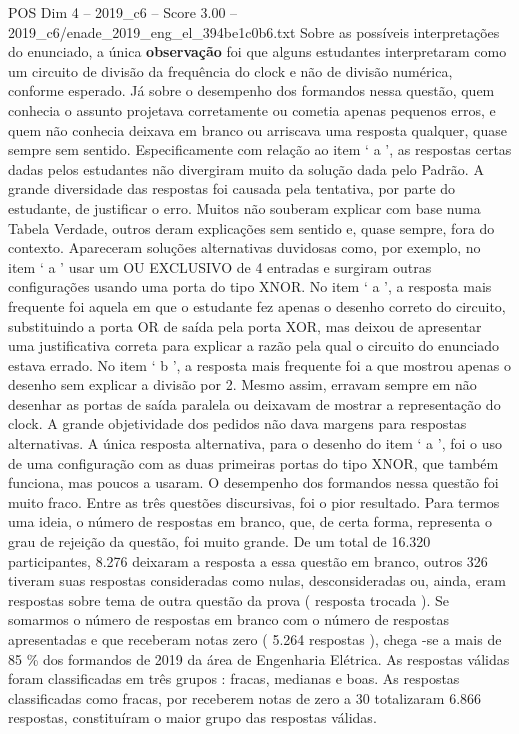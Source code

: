 \begin{textsample}{POS Dim 4 – 2019\_c6 – Score 3.00 – 2019\_c6/enade\_2019\_eng\_el\_394be1c0b6.txt}
Sobre as possíveis interpretações do enunciado, a única \textbf{observação} foi que alguns estudantes interpretaram como um circuito de divisão da frequência do clock e não de divisão numérica, conforme esperado.
Já sobre o desempenho dos formandos nessa questão, quem conhecia o assunto projetava corretamente ou cometia apenas pequenos erros, e quem não conhecia deixava em branco ou arriscava uma resposta qualquer, quase sempre sem sentido.
Especificamente com relação ao item ‘ a ’, as respostas certas dadas pelos estudantes não divergiram muito da solução dada pelo Padrão.
A grande diversidade das respostas foi causada pela tentativa, por parte do estudante, de justificar o erro.
Muitos não souberam explicar com base numa Tabela Verdade, outros deram explicações sem sentido e, quase sempre, fora do contexto.
Apareceram soluções alternativas duvidosas como, por exemplo, no item ‘ a ’ usar um OU EXCLUSIVO de 4 entradas e surgiram outras configurações usando uma porta do tipo XNOR.
No item ‘ a ’, a resposta mais frequente foi aquela em que o estudante fez apenas o desenho correto do circuito, substituindo a porta OR de saída pela porta XOR, mas deixou de apresentar uma justificativa correta para explicar a razão pela qual o circuito do enunciado estava errado.
No item ‘ b ’, a resposta mais frequente foi a que mostrou apenas o desenho sem explicar a divisão por 2.
Mesmo assim, erravam sempre em não desenhar as portas de saída paralela ou deixavam de mostrar a representação do clock.
A grande objetividade dos pedidos não dava margens para respostas alternativas.
A única resposta alternativa, para o desenho do item ‘ a ’, foi o uso de uma configuração com as duas primeiras portas do tipo XNOR, que também funciona, mas poucos a usaram.
O desempenho dos formandos nessa questão foi muito fraco.
Entre as três questões discursivas, foi o pior resultado.
Para termos uma ideia, o número de respostas em branco, que, de certa forma, representa o grau de rejeição da questão, foi muito grande.
De um total de 16.320 participantes, 8.276 deixaram a resposta a essa questão em branco, outros 326 tiveram suas respostas consideradas como nulas, desconsideradas ou, ainda, eram respostas sobre tema de outra questão da prova ( resposta trocada ).
Se somarmos o número de respostas em branco com o número de respostas apresentadas e que receberam notas zero ( 5.264 respostas ), chega -se a mais de 85 \% dos formandos de 2019 da área de Engenharia Elétrica.
As respostas válidas foram classificadas em três grupos : fracas, medianas e boas.
As respostas classificadas como fracas, por receberem notas de zero a 30 totalizaram 6.866 respostas, constituíram o maior grupo das respostas válidas.

\end{textsample}
